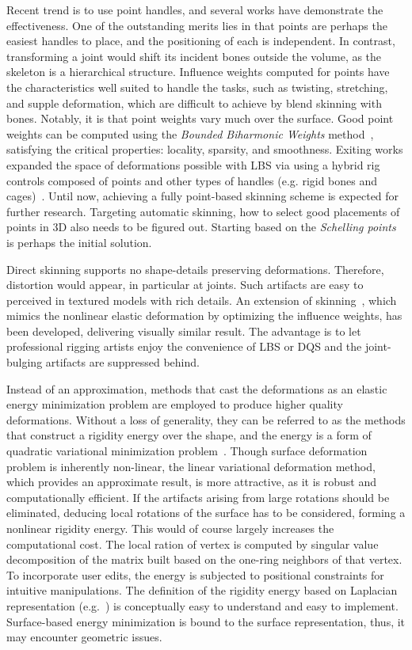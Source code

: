 Recent trend is to use point handles, and several works have demonstrate the effectiveness. One of the outstanding merits lies in that points are perhaps the easiest handles to place, and the positioning of each is independent. In contrast, transforming a joint would shift its incident bones outside the volume, as the skeleton is a hierarchical structure. Influence weights computed for points have the characteristics well suited to handle the tasks, such as twisting, stretching, and supple deformation, which are difficult to achieve by blend skinning with bones. Notably, it is that point weights vary much over the surface. Good point weights can be computed using the \textit{Bounded Biharmonic Weights} method~\cite{Jacobson:2011:BBW}, satisfying the critical properties: locality, sparsity, and smoothness. Exiting works expanded the space of deformations possible with LBS via using a hybrid rig controls composed of points and other types of handles (e.g. rigid bones and cages)~\cite{Jacobson:2011:BBW,Jacobson:2011:STB,Kavan:2012:EDC}. Until now, achieving a fully point-based skinning scheme is expected for further research. Targeting automatic skinning, how to select good placements of points in 3D also needs to be figured out. Starting based on the \textit{Schelling points}~\cite{Chen:2012:SPS} is perhaps the initial solution.

Direct skinning supports no shape-details preserving deformations. Therefore, distortion would appear, in particular at joints. Such artifacts are easy to perceived in textured models with rich details. An extension of skinning~\cite{Kavan:2012:EDC}, which mimics the nonlinear elastic deformation by optimizing the influence weights, has been developed, delivering visually similar result. The advantage is to let  professional rigging artists enjoy the convenience of LBS or DQS and the joint-bulging artifacts are suppressed behind.

Instead of an approximation, methods that cast the deformations as an elastic energy minimization problem are employed to produce higher quality deformations. Without a loss of generality, they can be referred to as the methods that construct a rigidity energy over the shape, and the energy is a form of  quadratic variational minimization problem~\cite{Botsch:2008:LVS}. Though surface deformation problem is inherently non-linear, the linear variational deformation method, which provides an approximate result, is more attractive, as it is robust and computationally efficient. If the artifacts arising from large rotations should be eliminated, deducing local rotations of the surface has to be considered, forming a nonlinear rigidity energy. This would of course largely increases the computational cost. The local ration of  vertex is computed by singular value decomposition of the matrix built based on the one-ring neighbors of that vertex. To incorporate user edits, the energy is subjected to positional constraints for intuitive manipulations. The definition of the rigidity energy based on Laplacian representation (e.g.~\cite{Sorkine:2007:ASM}) is conceptually easy to understand and easy to implement. Surface-based energy minimization is bound to the surface representation, thus, it may encounter geometric issues.

